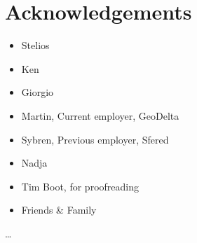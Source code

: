 
\chapter*{Acknowledgements}

\begin{itemize}
    \item Stelios
    \item Ken
    \item Giorgio
    \item Martin, Current employer, GeoDelta 
    \item Sybren, Previous employer, Sfered
    \item Nadja
    \item Tim Boot, for proofreading
    \item Friends \& Family
\end{itemize}

\ldots



 